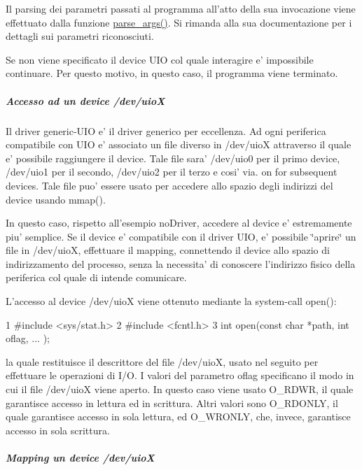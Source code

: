 Il parsing dei parametri passati al programma all'atto della sua invocazione viene effettuato dalla funzione \hyperlink{group___u_i_o-simple_gab6b18eb1bf7bc996599c06dc6dad8f53}{parse\+\_\+args()}. Si rimanda alla sua documentazione per i dettagli sui parametri riconosciuti.

Se non viene specificato il device U\+I\+O col quale interagire e' impossibile continuare. Per questo motivo, in questo caso, il programma viene terminato.

\subparagraph*{Accesso ad un device /dev/uio\+X}

Il driver generic-\/\+U\+I\+O e' il driver generico per eccellenza. Ad ogni periferica compatibile con U\+I\+O e' associato un file diverso in /dev/uio\+X attraverso il quale e' possibile raggiungere il device. Tale file sara' /dev/uio0 per il primo device, /dev/uio1 per il secondo, /dev/uio2 per il terzo e cosi' via. on for subsequent devices. Tale file puo' essere usato per accedere allo spazio degli indirizzi del device usando mmap().

In questo caso, rispetto all'esempio no\+Driver, accedere al device e' estremamente piu' semplice. Se il device e' compatibile con il driver U\+I\+O, e' possibile \char`\"{}aprire\char`\"{} un file in /dev/uio\+X, effettuare il mapping, connettendo il device allo spazio di indirizzamento del processo, senza la necessita' di conoscere l'indirizzo fisico della periferica col quale di intende comunicare.

L'accesso al device /dev/uio\+X viene ottenuto mediante la system-\/call open()\+: 
\begin{DoxyCode}
1 #include <sys/stat.h>
2 #include <fcntl.h>
3 int open(const char *path, int oflag, ...  );
\end{DoxyCode}
 la quale restituisce il descrittore del file /dev/uio\+X, usato nel seguito per effettuare le operazioni di I/\+O. I valori del parametro oflag specificano il modo in cui il file /dev/uio\+X viene aperto. In questo caso viene usato O\+\_\+\+R\+D\+W\+R, il quale garantisce accesso in lettura ed in scrittura. Altri valori sono O\+\_\+\+R\+D\+O\+N\+L\+Y, il quale garantisce accesso in sola lettura, ed O\+\_\+\+W\+R\+O\+N\+L\+Y, che, invece, garantisce accesso in sola scrittura.

\subparagraph*{Mapping un device /dev/uio\+X}

